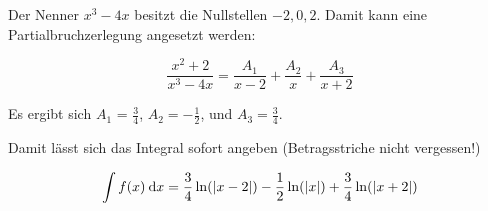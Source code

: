 \item Der Nenner $x^3-4x$ besitzt die Nullstellen $-2, 0, 2$. Damit kann eine Partialbruchzerlegung angesetzt werden:

$$\frac{x^2+2}{x^3-4x} = \frac{A_1}{x-2} + \frac{A_2}{x} + \frac{A_3}{x+2}$$

Es ergibt sich $A_1$ = $\frac{3}{4}$, $A_2=-\frac{1}{2}$, und $A_3 = \frac{3}{4}$.

Damit lässt sich das Integral sofort angeben (Betragsstriche nicht vergessen!)

$$ \int f(x)\:\mathrm{d}{x} = \frac{3}{4} \ln(|x-2|) - \frac{1}{2} \ln(|x|) + \frac{3}{4}\ln(|x+2|)$$
